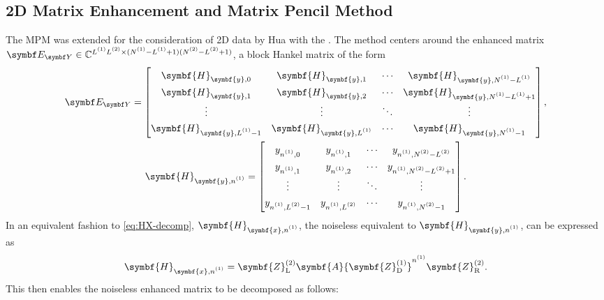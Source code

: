 \subsection{2D Matrix Enhancement and Matrix Pencil Method}
\label{subsec:mmempm}
The \ac{MPM} was extended for the consideration of \ac{2D} data by Hua with the
\cite{Hua1992}. The method centers around the enhanced matrix $\EY
\in \mathbb{C}^{\Lone \Ltwo \times (\None - \Lone + 1)(\Ntwo - \Ltwo + 1)}$,
a block Hankel matrix of the form
\begin{subequations}
    \begin{gather}
        \EY =
        \begin{bmatrix}
            \symbf{H}_{\symbf{y},0} & \symbf{H}_{\symbf{y},1} & \cdots & \symbf{H}_{\symbf{y},\None - \Lone} \\
            \symbf{H}_{\symbf{y},1} & \symbf{H}_{\symbf{y},2} & \cdots & \symbf{H}_{\symbf{y},\None - \Lone + 1} \\
            \vdots & \vdots & \ddots & \vdots \\
            \symbf{H}_{\symbf{y},\Lone - 1} & \symbf{H}_{\symbf{y},\Lone} & \cdots & \symbf{H}_{\symbf{y},\None - 1}
        \end{bmatrix}, \\
        \def\arraystretch{1.3}
        \symbf{H}_{\symbf{y},\none} =
        \begin{bmatrix}
            y_{ \none, 0 } & y_{ \none, 1 } & \cdots & y_{ \none, \Ntwo - \Ltwo } \\
            y_{ \none, 1 } & y_{ \none, 2 } & \cdots & y_{ \none, \Ntwo - \Ltwo + 1 } \\
            \vdots & \vdots & \ddots & \vdots \\
            y_{ \none, \Ltwo - 1 } & y_{ \none, \Ltwo } & \cdots & y_{ \none, \Ntwo - 1 }
        \end{bmatrix}.
    \end{gather}
\end{subequations}
In an equivalent fashion to \cref{eq:HX-decomp},
$\symbf{H}_{\symbf{x},\none}$, the noiseless equivalent to
$\symbf{H}_{\symbf{y},\none}$, can be expressed as
\begin{equation}
    \symbf{H}_{\symbf{x},\none} =
        \symbf{Z}^{(2)}_{\text{L}}
        \symbf{A}
        {\symbf{Z}^{(1)}_{\text{D}}}^{\none}
        \symbf{Z}^{(2)}_{\text{R}}.
\end{equation}
This then enables the noiseless enhanced matrix to be decomposed as follows:
